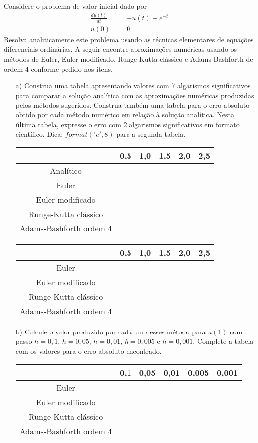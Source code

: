 \begin{exer} Considere o problema de valor inicial dado por
\begin{eqnarray*}
\frac{d u(t)}{dt} &=& -u(t) + e^{-t} \\
u(0)&=&0
\end{eqnarray*}
Resolva analiticamente este problema usando as técnicas elementares de equações diferenciais ordinárias. A seguir encontre aproximações numéricas usando os métodos de Euler, Euler modificado, Runge-Kutta clássico e Adams-Bashforth de ordem 4 conforme pedido nos itens.
\begin{itemize}
\item[a)]  Construa uma tabela apresentando valores com 7 algarismos significativos para comparar a solução analítica com as aproximações numéricas produzidas pelos métodos sugeridos. Construa também uma tabela para o erro absoluto obtido por cada método numérico em relação à solução analítica. Nesta última tabela, expresse o erro com 2 algarismos significativos em formato científico. Dica: $format('e',8)$ para a segunda tabela.
\begin{center}
\begin{tabular}{|c|c|c|c|c|c|}
\hline
&0,5&1,0&1,5&2,0&2,5\\
\hline
Analítico&&&&&\\
\hline
Euler&&&&&\\
\hline
Euler modificado&&&&&\\
\hline
Runge-Kutta clássico&&&&&\\
\hline
Adams-Bashforth ordem 4&&&&&\\
\hline
\end{tabular} 
\end{center}

\begin{center}
\begin{tabular}{|c|c|c|c|c|c|}
\hline
&0,5&1,0&1,5&2,0&2,5\\
\hline
Euler&&&&&\\
\hline
Euler modificado&&&&&\\
\hline
Runge-Kutta clássico&&&&&\\
\hline
Adams-Bashforth ordem 4&&&&&\\
\hline
\end{tabular}
\end{center}

\item[b)] Calcule o valor produzido por cada um desses método para $u(1)$ com passo $h=0,1$, $h=0,05$, $h=0,01$, $h=0,005$ e $h=0,001$. Complete a tabela com os valores para o erro absoluto encontrado.
\begin{center}
\begin{tabular}{|c|c|c|c|c|c|}
\hline
&0,1&0,05&0,01&0,005&0,001\\
\hline
Euler&&&&&\\
\hline
Euler modificado&&&&&   \\
\hline
Runge-Kutta clássico&&&&&\\
\hline
Adams-Bashforth ordem 4&&&&&\\
\hline
\end{tabular}
\end{center}


\end{itemize}
\end{exer}
